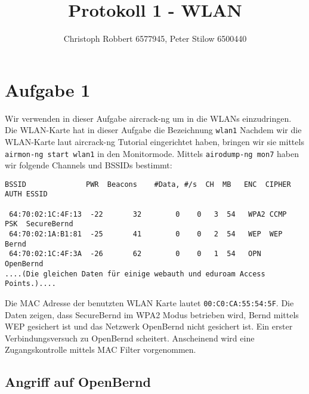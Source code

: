 \documentclass[10pt,a4paper]{article}
\author{Christoph Robbert 6577945, Peter Stilow 6500440}
\title{Protokoll 1 - WLAN}
\begin{document}
\maketitle
 
\section{Aufgabe 1}

Wir verwenden in dieser Aufgabe aircrack-ng um in die WLANs einzudringen. Die WLAN-Karte hat in dieser Aufgabe die Bezeichnung \texttt{wlan1}
Nachdem wir die WLAN-Karte laut aircrack-ng Tutorial eingerichtet haben, bringen wir sie mittels
\texttt{airmon-ng start wlan1} in den Monitormode. Mittels \texttt{airodump-ng mon7} haben wir folgende Channels und BSSIDs bestimmt:
\begin{verbatim}
BSSID              PWR  Beacons    #Data, #/s  CH  MB   ENC  CIPHER AUTH ESSID                                                                                                 
                                                                                                                                                                                
 64:70:02:1C:4F:13  -22       32        0    0   3  54   WPA2 CCMP   PSK  SecureBernd                                                                                           
 64:70:02:1A:B1:81  -25       41        0    0   2  54   WEP  WEP         Bernd                                                                                                 
 64:70:02:1C:4F:3A  -26       62        0    0   1  54   OPN              OpenBernd                                                                                             
....(Die gleichen Daten für einige webauth und eduroam Access Points.)....
\end{verbatim}
Die MAC Adresse der benutzten WLAN Karte lautet \texttt{00:C0:CA:55:54:5F}.
Die Daten zeigen, dass SecureBernd im WPA2 Modus betrieben wird, Bernd mittels WEP gesichert ist und das Netzwerk OpenBernd nicht gesichert ist. Ein erster Verbindungsversuch zu OpenBernd scheitert. Anscheinend wird eine Zugangskontrolle mittels MAC Filter vorgenommen.

\subsection{Angriff auf OpenBernd}
\end{document}

